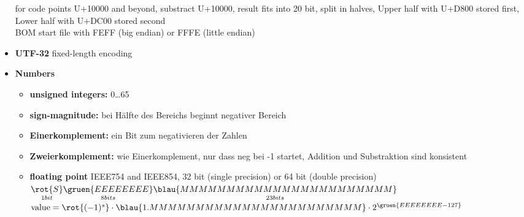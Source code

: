 \begin{itemize}
  for code points U+10000 and beyond, substract U+10000, result fits into 20 bit, split in halves, Upper half with U+D800 stored first, Lower half with U+DC00 stored second \\
  BOM start file with FEFF (big endian) or FFFE (little endian)
  \item \textbf{UTF-32} fixed-length encoding
  \item \textbf{Numbers}
   \begin{itemize}
    \item \textbf{unsigned integers:} 0\dots 65
    \item \textbf{sign-magnitude:} bei Hälfte des Bereichs beginnt negativer Bereich
    \item \textbf{Einerkomplement:} ein Bit zum negativieren der Zahlen
    \item \textbf{Zweierkomplement:} wie Einerkomplement, nur dass neg bei -1 startet, Addition und Substraktion sind konsistent
    \item \textbf{floating point} IEEE754 and IEEE854, 32 bit (single precision) or 64 bit (double precision) \\
    $\underset{1 bit}{\rot{S}}\underset{8 bits}{\gruen{EEEEEEEE}}\underset{23 bits}{\blau{MMMMMMMMMMMMMMMMMMMMMMM}}$ \\
    $\text{value} = \rot{(-1)^s}\cdot\blau{1.MMMMMMMMMMMMMMMMMMMMMMM}\cdot 2^{\gruen{EEEEEEEE-127}}$ \\
   \end{itemize}
 \end{itemize}
 
